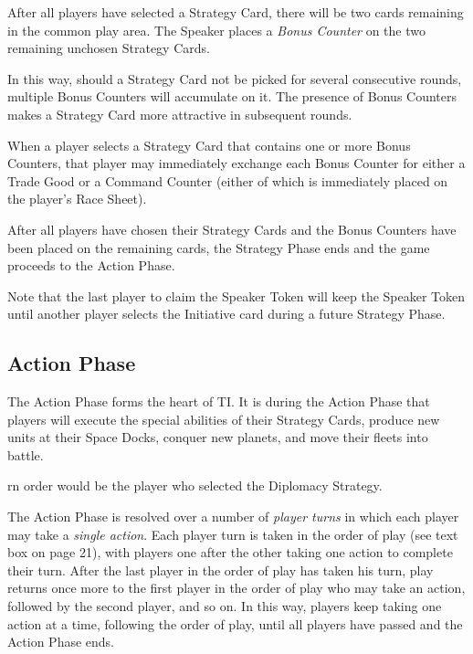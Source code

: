 \documentclass[11pt,fleqn]{book} %
\begin{document}
After all players have selected a Strategy Card, there will be two cards remaining in the common play area. The Speaker places a \emph{Bonus Counter} on the two remaining unchosen Strategy Cards.

In this way, should a Strategy Card not be picked for several consecutive rounds, multiple Bonus Counters will accumulate on it.
The presence of Bonus Counters makes a Strategy Card more attractive in subsequent rounds.

When a player selects a Strategy Card that contains one or more Bonus Counters, that player may immediately exchange each Bonus Counter for either a Trade Good or a Command Counter (either of which is immediately placed on the player's Race Sheet).

After all players have chosen their Strategy Cards and the Bonus Counters have been placed on the remaining cards, the Strategy Phase ends and the game proceeds to the Action Phase.

Note that the last player to claim the Speaker Token will keep the Speaker Token until another player selects the Initiative card during a future Strategy Phase.

\subsection{Action Phase} %
\label{sub:action_phase}

The Action Phase forms the heart of TI. It is during the Action Phase that players will execute the special abilities of their Strategy Cards, produce new units at their Space Docks, conquer new planets, and move their fleets into battle.

rn order would be the player who selected the Diplomacy Strategy.


The Action Phase is resolved over a number of \emph{player turns} in which each player may take a \emph{single action}. Each player turn is taken in the order of play (see text box on page 21), with players one after the other taking one action to complete their turn. After the last player in the order of play has taken his turn, play returns once more to the first player in the order of play who may take an action, followed by the second player, and so on. In this way, players keep taking one action at a time, following the order of play, until all players have passed and the Action Phase ends.
\end{document}
